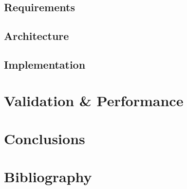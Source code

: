\documentclass[11pt,a4paper,twoside,
openright]{book}
\begin{document}
\section{Requirements}
\section{Architecture}
\section{Implementation}


\chapter{Validation \& Performance}

\chapter{Conclusions}

\appendix
\chapter{Bibliography}
\end{document}
